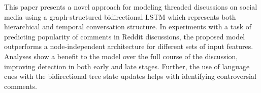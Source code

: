 This paper presents a novel approach for modeling threaded discussions on social media using a graph-structured bidirectional LSTM which represents both hierarchical and temporal conversation structure. In experiments with a task of predicting popularity of comments in Reddit discussions, the proposed model outperforms a node-independent architecture for different sets of input features. Analyses show a benefit to the model over the full course of the discussion, improving detection in both early and late stages. Further, the use of language cues with the bidirectional tree state updates helps with identifying controversial comments.
